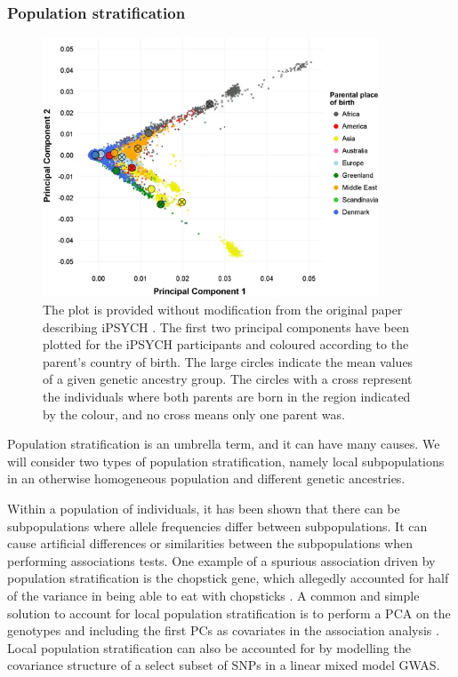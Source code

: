 \subsubsection{Population stratification}
\begin{figure}
	\includegraphics[width=10cm]{methods/iPSYCH_PCPlot.png}
	\caption[Scatter plot of the first two principal components of iPSYCH 
	participants coloured by parental country of birth]{The plot is provided without modification from the original paper describing iPSYCH \cite{pedersen2018ipsych2012}. The first two principal components have been plotted for the iPSYCH participants and coloured according to the parent's country of birth. The large circles indicate the mean values of a given genetic ancestry group. The circles with a cross represent the individuals where both parents are born in the region indicated by the colour, and no cross means only one parent was.}
	\label{fig:ipsych_PCPlot}
\end{figure}
Population stratification is an umbrella term, and it can have many causes. We will consider two types of population stratification, namely local subpopulations in an otherwise homogeneous population and different genetic ancestries. 

Within a population of individuals, it has been shown that there can be subpopulations where allele frequencies differ between subpopulations\cite{abdellaoui2013association,genome2014whole}. It can cause artificial differences or similarities between the subpopulations when performing associations tests. One example of a spurious association driven by population stratification is the chopstick gene, which allegedly accounted for half of the variance in being able to eat with chopsticks \cite{marees2018tutorial,hamer2000beware}. A common and simple solution to account for local population stratification is to perform a PCA on the genotypes and including the first PCs as covariates in the association analysis \cite{price2006principal,price2010new,prive2020efficient}. Local population stratification can also be accounted for by modelling the covariance structure of a select subset of SNPs in a linear mixed model GWAS.




